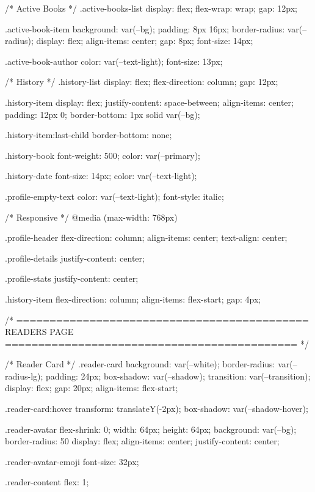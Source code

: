 /* Active Books */
.active-books-list {
  display: flex;
  flex-wrap: wrap;
  gap: 12px;
}

.active-book-item {
  background: var(--bg);
  padding: 8px 16px;
  border-radius: var(--radius);
  display: flex;
  align-items: center;
  gap: 8px;
  font-size: 14px;
}

.active-book-author {
  color: var(--text-light);
  font-size: 13px;
}

/* History */
.history-list {
  display: flex;
  flex-direction: column;
  gap: 12px;
}

.history-item {
  display: flex;
  justify-content: space-between;
  align-items: center;
  padding: 12px 0;
  border-bottom: 1px solid var(--bg);
}

.history-item:last-child {
  border-bottom: none;
}

.history-book {
  font-weight: 500;
  color: var(--primary);
}

.history-date {
  font-size: 14px;
  color: var(--text-light);
}

.profile-empty-text {
  color: var(--text-light);
  font-style: italic;
}

/* Responsive */
@media (max-width: 768px) {
  .profile-header {
    flex-direction: column;
    align-items: center;
    text-align: center;
  }

  .profile-details {
    justify-content: center;
  }

  .profile-stats {
    justify-content: center;
  }

  .history-item {
    flex-direction: column;
    align-items: flex-start;
    gap: 4px;
  }
}


/* ============================================
   READERS PAGE
   ============================================ */

/* Reader Card */
.reader-card {
  background: var(--white);
  border-radius: var(--radius-lg);
  padding: 24px;
  box-shadow: var(--shadow);
  transition: var(--transition);
  display: flex;
  gap: 20px;
  align-items: flex-start;
}

.reader-card:hover {
  transform: translateY(-2px);
  box-shadow: var(--shadow-hover);
}

.reader-avatar {
  flex-shrink: 0;
  width: 64px;
  height: 64px;
  background: var(--bg);
  border-radius: 50%
  display: flex;
  align-items: center;
  justify-content: center;
}

.reader-avatar-emoji {
  font-size: 32px;
}

.reader-content {
  flex: 1;
}

